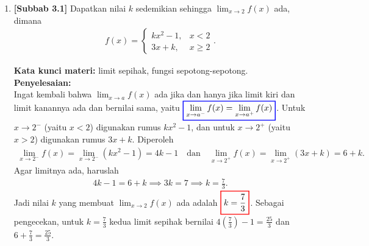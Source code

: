 \documentclass[10pt,openany,a4paper]{article}
\theoremstyle{definition}
\theoremstyle{definition}
\theoremstyle{plain}
\newenvironment{jawab}[2][tes]{%
\par\noindent\textbf{Kata kunci materi:} #1.\\
\textbf{Penyelesaian:} #2%
}{}
\begin{document}
\begin{enumerate}
    \item \textbf{[Subbab 3.1]} Dapatkan nilai $k$ sedemikian sehingga $\displaystyle\lim_{x\to 2}f(x)$ ada, dimana
    \begin{align*}
        f(x)=\begin{cases}
            kx^2-1, & x<2\\
            3x+k, & x\geq 2
        \end{cases}.
    \end{align*}
    \begin{jawab}[limit sepihak, fungsi sepotong-sepotong]{~\\
        Ingat kembali bahwa $\displaystyle\lim_{x\to a}f(x)$ ada jika dan hanya jika limit kiri dan limit kanannya ada dan bernilai sama, yaitu $\colorlet{oldcolor}{.}
        \color{blue}
        \setlength{\fboxrule}{1pt} \boxed{\color{oldcolor}\lim_{x \to a^-} f(x) = \lim_{x \to a^+} f(x)}\color{oldcolor}$. Untuk $x\to 2^-$ (yaitu $x<2$) digunakan rumus $kx^2-1$, dan untuk $x\to 2^+$ (yaitu $x>2$) digunakan rumus $3x+k$. Diperoleh
        \begin{align*}
            \lim_{x\to 2^-} f(x) = \lim_{x\to 2^-} (kx^2-1) = 4k-1 \quad\text{dan}\quad \lim_{x\to 2^+} f(x) = \lim_{x\to 2^+} (3x+k) = 6+k.
        \end{align*}
        Agar limitnya ada, haruslah
        \begin{align*}
            4k-1 = 6+k \implies 3k = 7 \implies k = \frac{7}{3}.
        \end{align*}
        Jadi nilai $k$ yang membuat $\displaystyle\lim_{x\to 2}f(x)$ ada adalah $\colorlet{oldcolor}{.}
        \color{red}
        \setlength{\fboxrule}{1pt} \boxed{\color{oldcolor}k=\frac{7}{3}}\color{oldcolor}$. Sebagai pengecekan, untuk $k=\frac{7}{3}$ kedua limit sepihak bernilai $4\left(\frac{7}{3}\right)-1=\frac{25}{3}$ dan $6+\frac{7}{3}=\frac{25}{3}$.
    }
    \end{jawab}


\end{enumerate}
\end{document}
